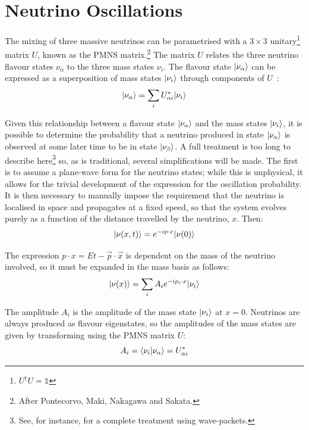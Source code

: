 \section{Neutrino Oscillations}\label{sec:neutrino_oscillations}
The mixing of three massive neutrinos can be parametrised with a $3\times 3$ unitary\footnote{$U^\dagger U = \mathbb{1}$} matrix $U$, known as the PMNS matrix.\footnote{After Pontecorvo, Maki, Nakagawa and Sakata.} The matrix $U$ relates the three neutrino flavour states $\nu_\alpha$ to the three mass states $\nu_i$. The flavour state $|\nu_{\alpha}\rangle$ can be expressed as a superposition of mass states $|\nu_{i}\rangle$ through components of $U$~\citep{Kayser1981}:
\begin{equation}\label{eqn:flavour_mass_mixing}
|\nu_{\alpha}\rangle = \sum_i U_{\alpha i}^* |\nu_{i}\rangle
\end{equation}

Given this relationship between a flavour state $|\nu_{\alpha}\rangle$ and the mass states $|\nu_{i}\rangle$, it is possible to determine the probability that a neutrino produced in state $|\nu_{\alpha}\rangle$ is observed at some later time to be in state $|\nu_{\beta}\rangle$. A full treatment is too long to describe here\footnote{See, for instance, \citep{Kayser1981} for a complete treatment using wave-packets.} so, as is traditional, several simplifications will be made. The first is to assume a plane-wave form for the neutrino states; while this is unphysical, it allows for the trivial development of the expression for the oscillation probability. It is then necessary to manually impose the requirement that the neutrino is localised in space and propagates at a fixed speed, so that the system evolves purely as a function of the distance travelled by the neutrino, $x$. Then:
\begin{equation}\label{eqn:plane_wave_nu_propagation}
|\nu(x,t)\rangle = e^{-i p\cdot x}|\nu(0)\rangle 
\end{equation}

The expression $p\cdot x = Et - \vec{p}\cdot\vec{x}$ is dependent on the mass of the neutrino involved, so it must be expanded in the mass basis as follows:
\begin{equation}\label{eqn:mass_expansion_of_propagation}
|\nu(x)\rangle = \sum_i A_i e^{-i p_i\cdot x}  |\nu_{i}\rangle
\end{equation}

The amplitude $A_i$ is the amplitude of the mass state $|\nu_{i}\rangle$ at $x=0$. Neutrinos are always produced as flavour eigenstates, so the amplitudes of the mass states are given by transforming using the PMNS matrix $U$:
\begin{equation}\label{eqn:mass_state_amplitudes}
A_i = \langle \nu_i|\nu_\alpha\rangle = U_{\alpha i}^*
\end{equation}

